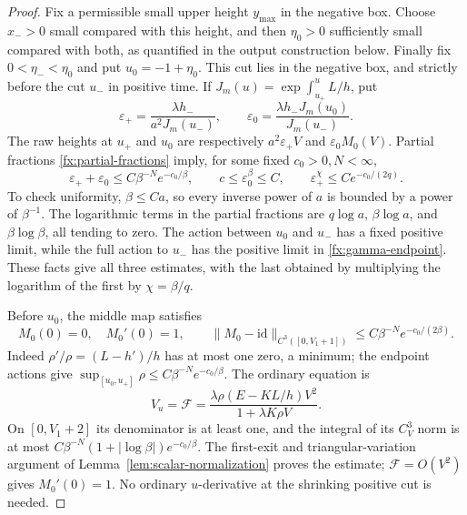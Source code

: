 \begin{proof}
Fix a permissible small upper height \(y_{\max}\) in the negative
box. Choose \(x_->0\) small compared with this height, and then
\(\eta_0>0\) sufficiently small compared with both, as quantified
in the output construction below. Finally fix
\(0<\eta_-<\eta_0\) and put \(u_0=-1+\eta_0\).
This cut lies in the negative box, and
strictly before the cut \(u_-\) in positive time. If
\(J_m(u)=\exp\int_{u_+}^u L/h\), put
\[
 \varepsilon_+=\frac{\lambda h_-}{a^2J_m(u_-)},\qquad
 \varepsilon_0=\frac{\lambda h_-J_m(u_0)}{J_m(u_-)}.
\]
The raw heights at \(u_+\) and \(u_0\) are respectively
\(a^2\varepsilon_+V\) and \(\varepsilon_0 M_0(V)\).
Partial fractions \eqref{fx:partial-fractions} imply, for some
fixed \(c_0>0,N<\infty\),
\begin{equation}\label{eq:early-saddle-smallness}
 \varepsilon_++\varepsilon_0
       \le C\beta^{-N}e^{-c_0/\beta},\qquad
 c\le\varepsilon_0^\beta\le C,\qquad
 \varepsilon_+^\chi\le Ce^{-c_0/(2q)} .
\end{equation}
To check uniformity, \(\beta\le Ca\), so every inverse power of
\(a\) is bounded by a power of \(\beta^{-1}\). The logarithmic
terms in the partial fractions are
\(q\log a\), \(\beta\log a\), and \(\beta\log\beta\),
all tending to zero. The action between \(u_0\) and \(u_-\)
has a fixed positive limit, while the full action to \(u_-\)
has the positive limit in \eqref{fx:gamma-endpoint}.
These facts give all three estimates, with the last obtained by
multiplying the logarithm of the first by \(\chi=\beta/q\).

Before \(u_0\), the middle map satisfies
\begin{equation}\label{eq:early-middle-identity}
 M_0(0)=0,\quad M_0'(0)=1,\qquad
 \|M_0-\mathrm{id}\|_{C^3([0,V_1+1])}
       \le C\beta^{-N}e^{-c_0/(2\beta)}.
\end{equation}
Indeed \(\rho'/\rho=(L-h')/h\) has at most one zero, a minimum;
the endpoint actions give
\(\sup_{[u_0,u_+]}\rho\le C\beta^{-N}e^{-c_0/\beta}\).
The ordinary equation is
\[
 V_u=\mathscr F=\frac{\lambda\rho(E-KL/h)V^2}{1+\lambda K\rho V}.
\]
On \([0,V_1+2]\) its denominator is at least one, and the integral
of its \(C^3_V\) norm is at most
\(C\beta^{-N}(1+|\log\beta|)e^{-c_0/\beta}\).
The first-exit and triangular-variation argument of
Lemma~\ref{lem:scalar-normalization} proves the estimate;
\(\mathscr F=O(V^2)\) gives \(M_0'(0)=1\). No ordinary
\(u\)-derivative at the shrinking positive cut is needed.


\end{proof}
